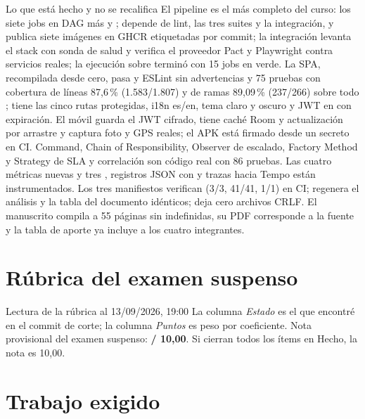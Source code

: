 \begin{logro}{Lo que est\'a hecho y no se recalifica}
El pipeline es el m\'as completo del curso: los siete jobs en DAG m\'as  y ;  depende de lint, las tres suites y la integraci\'on, y publica siete im\'agenes en GHCR etiquetadas por commit; la integraci\'on levanta el stack con sonda de salud y verifica el proveedor Pact y Playwright contra servicios reales; la ejecuci\'on sobre  termin\'o con 15 jobs en verde. La SPA, recompilada desde cero, pasa  y ESLint sin advertencias y 75 pruebas con cobertura de l\'ineas 87,6\,\% (1.583/1.807) y de ramas 89,09\,\% (237/266) sobre todo ; tiene las cinco rutas protegidas, i18n es/en, tema claro y oscuro y JWT en  con expiraci\'on. El m\'ovil guarda el JWT cifrado, tiene cach\'e Room y actualizaci\'on por arrastre y captura foto y GPS reales; el APK est\'a firmado desde un secreto en CI. Command, Chain of Responsibility, Observer de escalado, Factory Method y Strategy de SLA y correlaci\'on son c\'odigo real con 86 pruebas. Las cuatro m\'etricas nuevas y tres , registros JSON con  y trazas hacia Tempo est\'an instrumentados. Los tres manifiestos verifican (3/3, 41/41, 1/1) en CI;  regenera el an\'alisis y la tabla del documento id\'enticos;  deja cero archivos CRLF. El manuscrito compila a 55 p\'aginas sin indefinidas, su PDF corresponde a la fuente y la tabla de aporte ya incluye a los cuatro integrantes.
\end{logro}

\section{R\'ubrica del examen suspenso}

\reglarubrica



\begin{nota}{Lectura de la r\'ubrica al 13/09/2026, 19:00}
La columna \emph{Estado} es el que encontr\'e en el commit de corte; la columna \emph{Puntos} es peso por coeficiente. Nota provisional del examen suspenso: \textbf{\notaprov{} / 10,00}. Si cierran todos los \'items en Hecho, la nota es 10,00.
\end{nota}

\section{Trabajo exigido}


